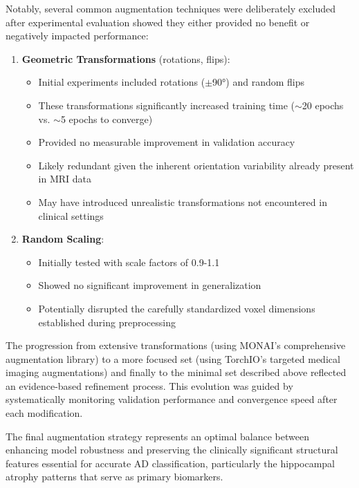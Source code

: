 \documentclass[12pt, a4paper]{article}
\begin{document}
Notably, several common augmentation techniques were deliberately excluded after experimental evaluation showed they either provided no benefit or negatively impacted performance:

\begin{enumerate}
    \item \textbf{Geometric Transformations} (rotations, flips):
    \begin{itemize}
        \item Initial experiments included rotations ($\pm$90°) and random flips
        \item These transformations significantly increased training time ($\sim$20 epochs vs. $\sim$5 epochs to converge)
        \item Provided no measurable improvement in validation accuracy
        \item Likely redundant given the inherent orientation variability already present in MRI data
        \item May have introduced unrealistic transformations not encountered in clinical settings
    \end{itemize}

    \item \textbf{Random Scaling}:
    \begin{itemize}
        \item Initially tested with scale factors of 0.9-1.1
        \item Showed no significant improvement in generalization
        \item Potentially disrupted the carefully standardized voxel dimensions established during preprocessing
    \end{itemize}
\end{enumerate}

The progression from extensive transformations (using MONAI's comprehensive augmentation library) to a more focused set (using TorchIO's targeted medical imaging augmentations) and finally to the minimal set described above reflected an evidence-based refinement process. This evolution was guided by systematically monitoring validation performance and convergence speed after each modification.

The final augmentation strategy represents an optimal balance between enhancing model robustness and preserving the clinically significant structural features essential for accurate AD classification, particularly the hippocampal atrophy patterns that serve as primary biomarkers.
\end{document}

